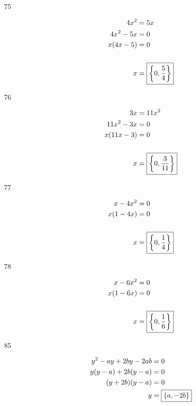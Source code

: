\documentclass[letterpaper, landscape]{exam}
\begin{document}
\begin{description}
      \item[75]
        \begin{align*}
          4x^2      & = 5x \\
          4x^2 - 5x & = 0 \\
          x(4x - 5) & = 0 \\
          \\
          x         & = \boxed{ \cbr{ 0, \frac{5}{4} } } \\
        \end{align*}

      \item[76]
        \begin{align*}
        3x         & = 11x^2 \\
        11x^2 - 3x & = 0 \\
        x(11x - 3) & = 0 \\
        \\
        x          & = \boxed{ \cbr{ 0, \frac{3}{11} } } \\
        \end{align*}

      \item[77]
        \begin{align*}
          x - 4x^2  & = 0 \\
          x(1 - 4x) & = 0 \\
          \\
          x         & = \boxed{ \cbr{ 0, \frac{1}{4} } } \\
        \end{align*}

      \item[78]
      \begin{align*}
        x - 6x^2  & = 0 \\
        x(1 - 6x) & = 0 \\
        \\
        x         & = \boxed{ \cbr{ 0, \frac{1}{6} } } \\
      \end{align*}

      \item[85]
      \begin{align*}
        y^2 - ay + 2by - 2ab & = 0 \\
        y(y - a) + 2b(y - a) & = 0 \\
        (y + 2b)(y - a)      & = 0 \\
        y                    & = \boxed{ \cbr{ a, -2b } } \\
      \end{align*}


\end{description}
\end{document}
